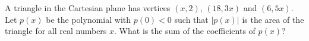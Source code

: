 A triangle in the Cartesian plane has vertices $(x,2)$, $(18,3x)$ and $(6,5x)$. Let $p(x)$ be the polynomial with $p(0)<0$ such that $\left|p(x)\right|$ is the area of the triangle for all real numbers $x$. What is the sum of the coefficients of $p(x)$?
